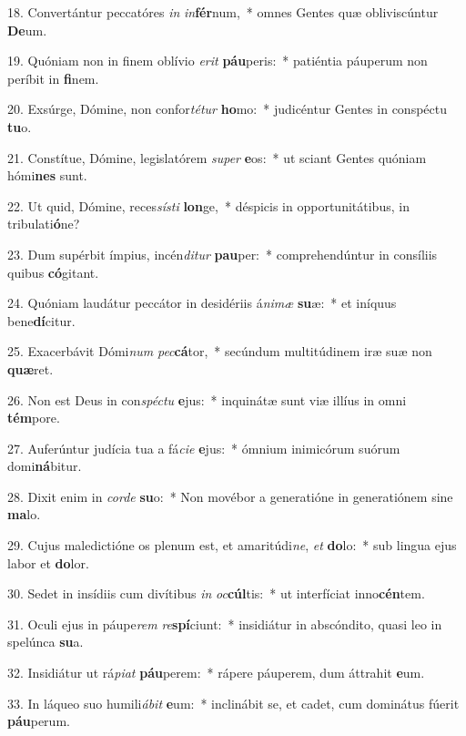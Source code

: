 18. Convertántur peccatóres \textit{in} \textit{in}\textbf{fér}num,~*  omnes Gentes quæ obliviscúntur \textbf{De}um.\

19. Quóniam non in finem oblívio \textit{e}\textit{rit} \textbf{páu}peris:~*  patiéntia páuperum non períbit in \textbf{fi}nem.\

20. Exsúrge, Dómine, non confor\textit{té}\textit{tur} \textbf{ho}mo:~*  judicéntur Gentes in conspéctu \textbf{tu}o.\

21. Constítue, Dómine, legislatórem \textit{su}\textit{per} \textbf{e}os:~*  ut sciant Gentes quóniam hómi\textbf{nes} sunt.\

22. Ut quid, Dómine, reces\textit{sís}\textit{ti} \textbf{lon}ge,~*  déspicis in opportunitátibus, in tribulati\textbf{ó}ne?\

23. Dum supérbit ímpius, incén\textit{di}\textit{tur} \textbf{pau}per:~*  comprehendúntur in consíliis quibus \textbf{có}gitant.\

24. Quóniam laudátur peccátor in desidériis á\textit{ni}\textit{mæ} \textbf{su}æ:~*  et iníquus bene\textbf{dí}citur.\

25. Exacerbávit Dómi\textit{num} \textit{pec}\textbf{cá}tor,~*  secúndum multitúdinem iræ suæ non \textbf{quæ}ret.\

26. Non est Deus in con\textit{spéc}\textit{tu} \textbf{e}jus:~*  inquinátæ sunt viæ illíus in omni \textbf{tém}pore.\

27. Auferúntur judícia tua a fá\textit{ci}\textit{e} \textbf{e}jus:~*  ómnium inimicórum suórum domi\textbf{ná}bitur.\

28. Dixit enim in \textit{cor}\textit{de} \textbf{su}o:~*  Non movébor a generatióne in generatiónem sine \textbf{ma}lo.\

29. Cujus maledictióne os plenum est, et amaritúdi\textit{ne}, \textit{et} \textbf{do}lo:~*  sub lingua ejus labor et \textbf{do}lor.\

30. Sedet in insídiis cum divítibus \textit{in} \textit{oc}\textbf{cúl}tis:~*  ut interfíciat inno\textbf{cén}tem.\

31. Oculi ejus in páupe\textit{rem} \textit{re}\textbf{spí}ciunt:~*  insidiátur in abscóndito, quasi leo in spelúnca \textbf{su}a.\

32. Insidiátur ut rá\textit{pi}\textit{at} \textbf{páu}perem:~*  rápere páuperem, dum áttrahit \textbf{e}um.\

33. In láqueo suo humili\textit{á}\textit{bit} \textbf{e}um:~*  inclinábit se, et cadet, cum dominátus fúerit \textbf{páu}perum.\

